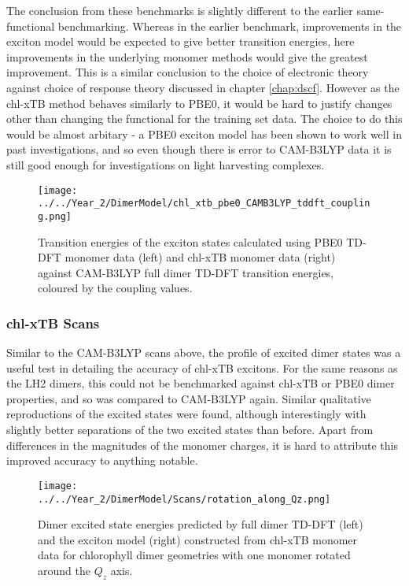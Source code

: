 The conclusion from these benchmarks is slightly different to the earlier same-functional
benchmarking. Whereas in the earlier benchmark, improvements in the exciton model
would be expected to give better transition energies, here improvements in the underlying
monomer methods would give the greatest improvement. This is a similar conclusion
to the choice of electronic theory against choice of response theory discussed in
chapter \ref{chap:dscf}. However as the chl-xTB method behaves similarly to PBE0,
it would be hard to justify changes other than changing the functional for the training 
set data. The choice to do this would be almost arbitary - a PBE0 exciton model has
been shown to work well in past investigations, and so even though there is error
to CAM-B3LYP data it is still good enough for investigations on light harvesting 
complexes.

\begin{figure}
    \centering
    \texttt{[image: ../../Year\_2/DimerModel/chl\_xtb\_pbe0\_CAMB3LYP\_tddft\_coupling.png]}
    \label{fig:chl_xtb_pbe0_LH2}
    \caption{Transition energies of the exciton states calculated using PBE0 TD-DFT
    monomer data (left) and chl-xTB monomer data (right) against CAM-B3LYP full
    dimer TD-DFT transition energies, coloured by the coupling values.}
\end{figure}

\subsubsection{chl-xTB Scans}
\label{subsubsec:chl_xtb_scans}

Similar to the CAM-B3LYP scans above, the profile of excited dimer states was a useful
test in detailing the accuracy of chl-xTB excitons. For the same reasons as the
LH2 dimers, this could not be benchmarked against chl-xTB or PBE0 dimer properties,
and so was compared to CAM-B3LYP again. Similar qualitative reproductions of the
excited states were found, although interestingly with slightly better separations
of the two excited states than before. Apart from differences in the magnitudes 
of the monomer charges, it is hard to attribute this improved accuracy to anything
notable.

\begin{figure}
    \centering
    \texttt{[image: ../../Year\_2/DimerModel/Scans/rotation\_along\_Qz.png]}
    \label{fig:chl_xtb_rot_Qz}
    \caption{Dimer excited state energies predicted by full dimer TD-DFT (left)
    and the exciton model (right) constructed from chl-xTB monomer data for chlorophyll 
    dimer geometries with one monomer rotated around the $Q_z$ axis.}
\end{figure}

